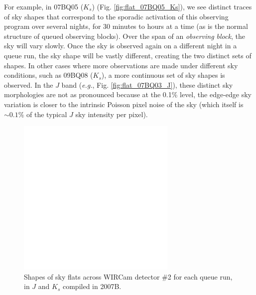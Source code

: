 \documentclass[iop]{emulateapj}
\newcommand{\eg}{\textit{e.g.}}
\begin{document}
For example, in 07BQ05 ($K_s$) (Fig. \ref{fig:flat_07BQ05_Ks}), we see distinct traces of sky shapes that correspond to the sporadic activation of this observing program over several nights, for 30 minutes to hours at a time (as is the normal structure of queued observing blocks). Over the span of an \emph{observing block}, the sky will vary slowly. Once the sky is observed again on a different night in a queue run, the sky shape will be vastly different, creating the two distinct sets of shapes. In other cases where more observations are made under different sky conditions, such as 09BQ08 ($K_s$), a more continuous set of sky shapes is observed. In the $J$ band (\eg, Fig. \ref{fig:flat_07BQ03_J}), these distinct sky morphologies are not as pronounced because at the 0.1\% level, the edge-edge sky variation is closer to the intrinsic Poisson pixel noise of the sky (which itself is $\sim 0.1\%$ of the typical $J$ sky intensity per pixel).

\begin{figure}[t]
 \centering
     \includegraphics[width=3in]{figs/flatslices_07.pdf}
 \caption{Shapes of sky flats across WIRCam detector \#2 for each queue run, in $J$ and $K_s$ compiled in 2007B.}
 \label{fig:flat_flatslices_07}
\end{figure}

\end{document}
